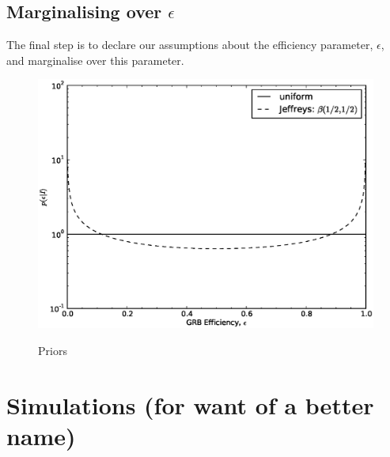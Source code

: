 \documentclass[twocolumn,nofootinbib]{revtex4-1}
\begin{document}
\subsection{Marginalising over $\epsilon$}

The final step is to declare our assumptions about the efficiency parameter, $\epsilon$,
and marginalise over this parameter.

\begin{figure}%
\centering
{\includegraphics[width=\linewidth]{efficiency_prior.eps}}\label{fig:priors}
\caption{Priors}
\end{figure}


\section{Simulations (for want of a better name)}
\end{document}
